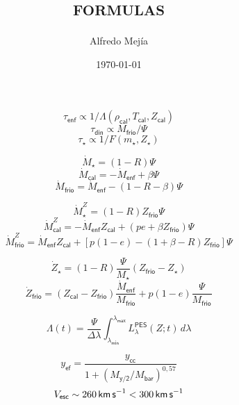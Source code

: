 \documentclass[12pt]{article}
\title{\textsc{formulas}}
\author{Alfredo Mejía}
\date{\today}
\begin{document}
$$\tau_\textsf{enf} \propto 1/\Lambda(\rho_\textsf{cal},T_\textsf{cal},Z_\textsf{cal})$$
$$\tau_\textsf{din} \propto M_\textsf{frio}/\Psi$$
$$\tau_\star \propto 1/F(m_\star, Z_\star)$$

$$\dot{M}_\star = (1-R)\Psi$$
$$\dot{M}_\textsf{cal} = -\dot{M}_\textsf{enf} + \beta\Psi$$
$$\dot{M}_\textsf{frio} = \dot{M}_\textsf{enf} - (1-R-\beta)\Psi$$


$$\dot{M}_\star^Z = (1-R)Z_\textsf{frio}\Psi$$
$$\dot{M}_\textsf{cal}^Z = -\dot{M}_\textsf{enf}Z_\textsf{cal} + (pe+\beta Z_\textsf{frio})\Psi$$
$$\dot{M}_\textsf{frio}^Z = \dot{M}_\textsf{enf}Z_\textsf{cal} + [p(1-e)-(1+\beta-R)Z_\textsf{frio}]\Psi$$

$$\dot{Z}_\star = (1-R)\frac{\Psi}{M_\star}(Z_\textsf{frio}-Z_\star)$$
$$\dot{Z}_\textsf{frio} = (Z_\textsf{cal}-Z_\textsf{frio})\frac{\dot{M}_\textsf{enf}}{M_\textsf{frio}} + p(1-e)\frac{\Psi}{M_\textsf{frio}}$$

\newpage

$$\Lambda(t) = \frac{\Psi}{\Delta\lambda}\int_{\lambda_\textsf{min}}^{\lambda_\textsf{max}}L_\lambda^\textsf{PES}(Z;t)\,d\lambda$$

$$y_\textsf{ef} = \frac{y_\textsf{cc}}{1 + (M_\textsf{y/2}/M_\textsf{bar})^{0,57}}$$
$$V_\textsf{esc} \sim 260\,\textsf{km\,s}^{-1} < 300\,\textsf{km\,s}^{-1}$$
\end{document}
